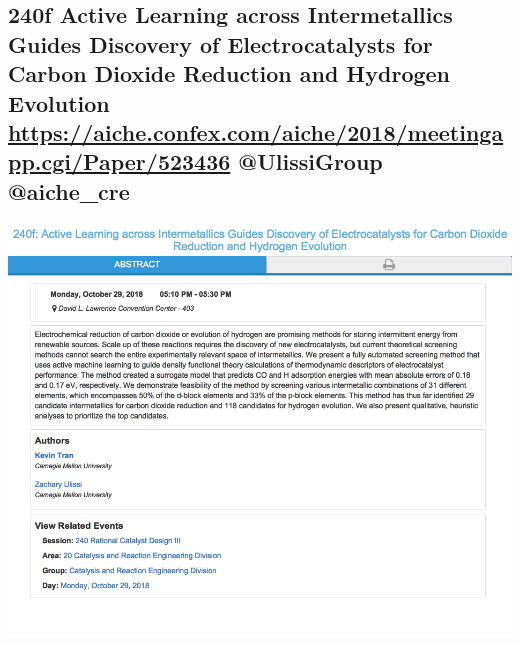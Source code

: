 \documentclass[11pt]{article}
\begin{document}
\subsection{240f Active Learning across Intermetallics Guides Discovery of Electrocatalysts for Carbon Dioxide Reduction and Hydrogen Evolution \url{https://aiche.confex.com/aiche/2018/meetingapp.cgi/Paper/523436} @UlissiGroup @aiche\_cre}
\label{sec:orgdf0989f}
\begin{center}
\includegraphics[width=.9\linewidth]{./523436.png}
\end{center}
\end{document}
